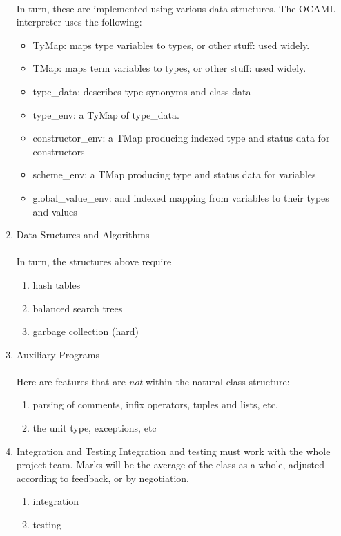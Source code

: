 \documentclass[12pt]{article}
\begin{document}
\begin{enumerate}
\paragraph*{}
In turn, these are implemented using various data structures. The OCAML
interpreter uses the following:

\begin{itemize}
\item{TyMap}: maps type variables to types, or other stuff: used widely.
\item{TMap}: maps term variables to types, or other stuff: used widely.
\item  type\_data: describes type synonyms and class data 
\item type\_env: a TyMap of type\_data. 
\item constructor\_env: a TMap producing indexed type and status data for constructors
\item scheme_env: a TMap producing  type and status data for variables 
\item global\_value\_env: and indexed mapping from variables to their types and values 
\end{itemize}

\item Data Sructures and Algorithms 
\paragraph*{}
In turn, the structures above require
\begin{enumerate}[label*=\arabic*]
\item
hash tables
\item
balanced search trees
\item garbage collection (hard) 
\end{enumerate}



\item Auxiliary Programs
\paragraph*{}
Here are features that are {\em not} within the natural class structure:
\begin{enumerate}[label*=\arabic*]
\item parsing of comments, infix operators, tuples and lists, etc.
\item the unit type, exceptions, etc 
\end{enumerate}


\item Integration and Testing
Integration and testing must work with the whole project team.  Marks
will be the average of the class as a whole, adjusted according to
feedback, or by negotiation. 
\begin{enumerate}[label*=\arabic*]
\item integration
\item testing
\end{enumerate}

\end{enumerate}
\end{document}
